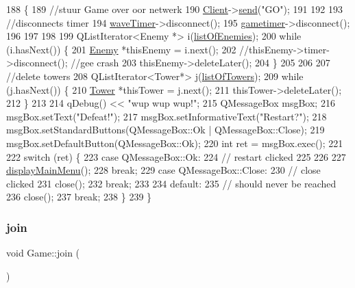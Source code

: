\begin{DoxyCode}
188 \{  
189     \textcolor{comment}{//stuur Game over oor netwerk}
190     \hyperlink{class_game_aa7fd8508fad68c550129f2be61c37467}{Client}->\hyperlink{class_u_d_p_socket_a66a6c4663cc3084cb4d76583e8039083}{send}(\textcolor{stringliteral}{"GO"});
191 
192 
193     \textcolor{comment}{//disconnects timer}
194     \hyperlink{class_game_a06a7795cf068aa5cc3b1debbea3f82ef}{waveTimer}->disconnect();
195     \hyperlink{class_game_a8feee9081542b15a9f2d889a6f1c8257}{gametimer}->disconnect();
196 
197 
198 
199     QListIterator<Enemy *> i(\hyperlink{class_game_ab96914bfc1e59035233105abfb0787fe}{listOfEnemies});
200     \textcolor{keywordflow}{while} (i.hasNext()) \{
201         \hyperlink{class_enemy}{Enemy} *thisEnemy = i.next();
202         \textcolor{comment}{//thisEnemy->timer->disconnect(); //gee crash}
203         thisEnemy->deleteLater();
204     \}
205 
206 
207     \textcolor{comment}{//delete towers}
208     QListIterator<Tower*> j(\hyperlink{class_game_aa0614c45667257e5be61685c33a2bec6}{listOfTowers});
209     \textcolor{keywordflow}{while} (j.hasNext()) \{
210         \hyperlink{class_tower}{Tower} *thisTower = j.next();
211         thisTower->deleteLater();
212     \}
213 
214     qDebug() << \textcolor{stringliteral}{"wup wup wup!"};
215     QMessageBox msgBox;
216     msgBox.setText(\textcolor{stringliteral}{"Defeat!"});
217     msgBox.setInformativeText(\textcolor{stringliteral}{"Restart?"});
218     msgBox.setStandardButtons(QMessageBox::Ok | QMessageBox::Close);
219     msgBox.setDefaultButton(QMessageBox::Ok);
220     \textcolor{keywordtype}{int} ret = msgBox.exec();
221 
222     \textcolor{keywordflow}{switch} (ret) \{
223     \textcolor{keywordflow}{case} QMessageBox::Ok:
224         \textcolor{comment}{// restart clicked}
225 
226 
227         \hyperlink{class_game_af74fd203e3b31917ca9d4769fa608c48}{displayMainMenu}();
228         \textcolor{keywordflow}{break};
229     \textcolor{keywordflow}{case} QMessageBox::Close:
230         \textcolor{comment}{// close clicked}
231         close();
232         \textcolor{keywordflow}{break};
233 
234     \textcolor{keywordflow}{default}:
235         \textcolor{comment}{// should never be reached}
236         close();
237         \textcolor{keywordflow}{break};
238     \}
239 \}
\end{DoxyCode}
\mbox{\label{class_game_ae95e1d94393a35f3d4edda97ebfc3358}} 
\subsubsection{\texorpdfstring{join}{join}}
{\footnotesize\ttfamily void Game\+::join (\begin{DoxyParamCaption}{ }\end{DoxyParamCaption})\hspace{0.3cm}{\ttfamily [slot]}}



